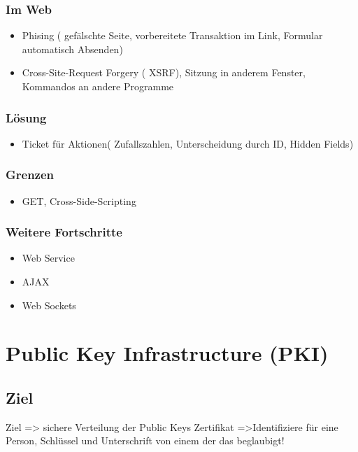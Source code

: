 {\subsubsection*{ Im Web }
\begin{itemize}
	\item Phising ( gefälschte Seite, vorbereitete Transaktion im Link, Formular automatisch Absenden)
	\item Cross-Site-Request Forgery ( XSRF), Sitzung in anderem Fenster, Kommandos an andere Programme
\end{itemize}

\subsubsection*{ Lösung }
\begin{itemize}
	\item Ticket für Aktionen( Zufallszahlen, Unterscheidung durch ID, Hidden Fields)
\end{itemize}

\subsubsection*{ Grenzen }
\begin{itemize}
	\item GET, Cross-Side-Scripting
\end{itemize}

\subsubsection*{ Weitere Fortschritte }
\begin{itemize}
	\item Web Service
	\item AJAX
	\item Web Sockets
\end{itemize}


\section*{Public Key Infrastructure (PKI)}
\subsection*{ Ziel}
Ziel 			=> sichere Verteilung der Public Keys
Zertifikat	 =>Identifiziere für eine Person, Schlüssel und Unterschrift von einem der das beglaubigt!

}

